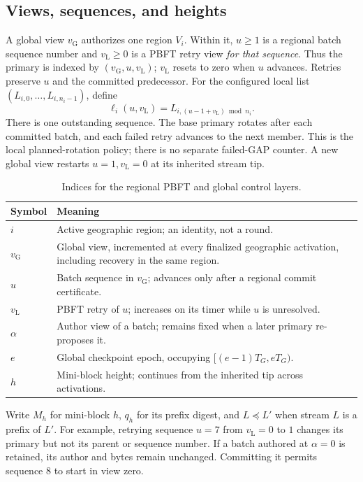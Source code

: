 \documentclass[11pt,a4paper,onecolumn]{article}
\newcommand{\gv}{v_{\mathrm G}}
\newcommand{\lv}{v_{\mathrm L}}
\newcommand{\pre}{\preceq}
\theoremstyle{remark}\newtheorem{example}[definition]{Example}
\begin{document}
\subsection{Views, sequences, and heights}\label{sec:indices}
A global view $\gv$ authorizes one region $V_i$. Within it, $u\geq1$ is a
regional batch sequence number and $\lv\geq0$ is a PBFT retry view \emph{for
that sequence}. Thus the primary is indexed by $(\gv,u,\lv)$; $\lv$ resets to
zero when $u$ advances. Retries preserve $u$ and the committed predecessor.
For the configured local list $(L_{i,0},\ldots,L_{i,n_i-1})$, define
\begin{equation}\label{eq:primary}
 \ell_i(u,\lv)=L_{i,(u-1+\lv)\bmod n_i}.
\end{equation}
There is one outstanding sequence. The base primary rotates after each
committed batch, and each failed retry advances to the next member. This is
the local planned-rotation policy; there is no separate failed-GAP counter.
A new global view restarts $u=1,\lv=0$ at its inherited stream tip.

\begin{table}[htbp]\centering\small
\begin{tabularx}{\textwidth}{@{}p{}Y@{}}\toprule
Symbol & Meaning\\\midrule
$i$ & Active geographic region; an identity, not a round.\\
$\gv$ & Global view, incremented at every finalized geographic activation,
including recovery in the same region.\\
$u$ & Batch sequence in $\gv$; advances only after a regional commit certificate.\\
$\lv$ & PBFT retry of $u$; increases on its timer while $u$ is unresolved.\\
$\alpha$ & Author view of a batch; remains fixed when a later primary re-proposes it.\\
$e$ & Global checkpoint epoch, occupying $[(e-1)T_G,eT_G)$.\\
$h$ & Mini-block height; continues from the inherited tip across activations.\\\bottomrule
\end{tabularx}
\caption{Indices for the regional PBFT and global control layers.}
\end{table}
Write $M_h$ for mini-block $h$, $q_h$ for its prefix digest, and $L\pre L'$
when stream $L$ is a prefix of $L'$. For example, retrying sequence $u=7$
from $\lv=0$ to $1$ changes its primary but not its parent or sequence number.
If a batch authored at $\alpha=0$ is retained, its author and bytes remain
unchanged. Committing it permits sequence $8$ to start in view zero.
\end{document}
